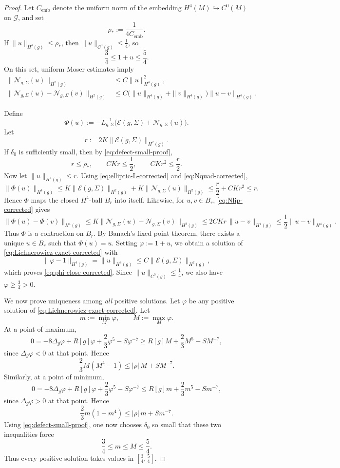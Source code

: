 \documentclass[10pt,a4paper]{amsart}
\begin{document}
\begin{proof}
\noindent Let \(C_{\mathrm{emb}}\) denote the uniform norm of the embedding
\(H^{4}(M)\hookrightarrow C^{0}(M)\) on \(\mathcal G\), and set
\[
\rho_{*}:=\frac{1}{4C_{\mathrm{emb}}}.
\]
If \(\|u\|_{H^{4}(g)}\le \rho_{*}\), then \(\|u\|_{C^{0}(g)}\le \frac14\), so
\[
\frac34\le 1+u\le \frac54.
\]
On this set, uniform Moser estimates imply
\begin{align}
\label{eq:Nquad-corrected}
\|\mathcal N_{g,\Sigma}(u)\|_{H^{2}(g)}
&\le
C\|u\|_{H^{4}(g)}^{2},\\
\label{eq:Nlip-corrected}
\|\mathcal N_{g,\Sigma}(u)-\mathcal N_{g,\Sigma}(v)\|_{H^{2}(g)}
&\le
C\bigl(\|u\|_{H^{4}(g)}+\|v\|_{H^{4}(g)}\bigr)\|u-v\|_{H^{4}(g)}.
\end{align}

\noindent Define
\[
\Phi(u):=
-L_{g,\Sigma}^{-1}\bigl(\mathcal E(g,\Sigma)+\mathcal N_{g,\Sigma}(u)\bigr).
\]
Let
\[
r:=2K\|\mathcal E(g,\Sigma)\|_{H^{2}(g)}.
\]
If \(\delta_{0}\) is sufficiently small, then by \eqref{eq:defect-small-proof},
\[
r\le \rho_{*},
\qquad
CKr\le \frac12,
\qquad
CKr^{2}\le \frac r2.
\]
Now let \(\|u\|_{H^{4}(g)}\le r\). Using \eqref{eq:elliptic-L-corrected} and
\eqref{eq:Nquad-corrected},
\[
\|\Phi(u)\|_{H^{4}(g)}
\le
K\|\mathcal E(g,\Sigma)\|_{H^{2}(g)}
+
K\|\mathcal N_{g,\Sigma}(u)\|_{H^{2}(g)}
\le
\frac r2+CKr^{2}
\le r.
\]
Hence \(\Phi\) maps the closed \(H^{4}\)-ball \(B_{r}\) into itself. Likewise, for
\(u,v\in B_{r}\), \eqref{eq:Nlip-corrected} gives
\[
\|\Phi(u)-\Phi(v)\|_{H^{4}(g)}
\le
K\|\mathcal N_{g,\Sigma}(u)-\mathcal N_{g,\Sigma}(v)\|_{H^{2}(g)}
\le
2CKr\,\|u-v\|_{H^{4}(g)}
\le
\frac12\|u-v\|_{H^{4}(g)}.
\]
Thus \(\Phi\) is a contraction on \(B_{r}\). By Banach's fixed-point theorem, there exists
a unique \(u\in B_{r}\) such that \(\Phi(u)=u\). Setting \(\varphi:=1+u\), we obtain a
solution of \eqref{eq:Lichnerowicz-exact-corrected} with
\[
\|\varphi-1\|_{H^{4}(g)}=\|u\|_{H^{4}(g)}
\le
C\|\mathcal E(g,\Sigma)\|_{H^{2}(g)},
\]
which proves \eqref{eq:phi-close-corrected}. Since \(\|u\|_{C^{0}(g)}\le \frac14\), we also
have \(\varphi\ge \frac34>0\).

\noindent We now prove uniqueness among \emph{all} positive solutions. Let \(\varphi\) be any
positive solution of \eqref{eq:Lichnerowicz-exact-corrected}. Let
\[
m:=\min_{M}\varphi,
\qquad
M:=\max_{M}\varphi.
\]
At a point of maximum,
\[
0
=
-8\Delta_{g}\varphi + R[g]\varphi + \frac23\varphi^{5}-S\varphi^{-7}
\ge
R[g]M+\frac23 M^{5}-S M^{-7},
\]
since $\Delta_{g} \varphi<0$ at that point.
Hence
\[
\frac23 M(M^{4}-1)\le |\rho|\,M + S M^{-7}.
\]
Similarly, at a point of minimum,
\[
0
=
-8\Delta_{g}\varphi + R[g]\varphi + \frac23\varphi^{5}-S\varphi^{-7}
\le
R[g]m+\frac23 m^{5}-S m^{-7},
\]
since $\Delta_{g} \varphi>0$ at that point.
Hence
\[
\frac23 m(1-m^{4})\le |\rho|\,m + S m^{-7}.
\]
Using \eqref{eq:defect-small-proof}, one now chooses \(\delta_{0}\) so small that these two
inequalities force
\[
\frac34\le m\le M\le \frac54.
\]
Thus every positive solution takes values in \([\frac34,\frac54]\).


\end{proof}
\end{document}
